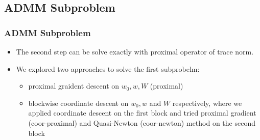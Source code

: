 \documentclass{beamer}
\begin{document}
\subsection{ADMM Subproblem}
\begin{frame}
\frametitle{ADMM Subproblem}
\begin{itemize}
  \item The second step can be solve exactly with proximal operator of trace norm.
  \item We explored two approaches to solve the first subprobelm:
    \begin{itemize}
      \item proximal graident descent on $w_0, w, W$ (proximal)
      \item blockwise coordinate descent on $w_0, w$ and $W$ respectively, where we applied coordinate descent on the first block and tried proximal gradient (coor-proximal) and Quasi-Newton (coor-newton) method on the second block
    \end{itemize}
\end{itemize}
\end{frame}
\end{document}
